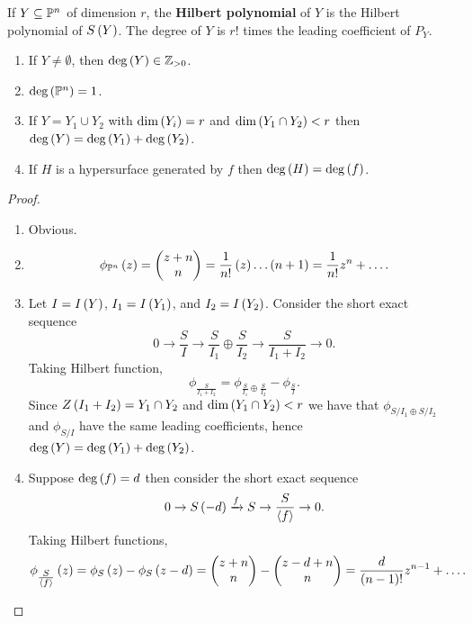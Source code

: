\pagebreak

\begin{definition}
If $ Y \subseteq \P^n $ of dimension $ r $, the \textbf{Hilbert polynomial} of $ Y $ is the Hilbert polynomial of $ S\rb{Y} $. The degree of $ Y $ is $ r! $ times the leading coefficient of $ P_Y $.
\end{definition}

\begin{theorem}
\hfill
\begin{enumerate}
\item If $ Y \ne \emptyset $, then $ \deg\rb{Y} \in \Z_{> 0} $.
\item $ \deg\rb{\P^n} = 1 $.
\item If $ Y = Y_1 \cup Y_2 $ with $ \dim\rb{Y_i} = r $ and $ \dim\rb{Y_1 \cap Y_2} < r $ then $ \deg\rb{Y} = \deg\rb{Y_1} + \deg\rb{Y_2} $.
\item If $ H $ is a hypersurface generated by $ f $ then $ \deg\rb{H} = \deg\rb{f} $.
\end{enumerate}
\end{theorem}

\begin{proof}
\hfill
\begin{enumerate}
\item Obvious.
\item
$$ \phi_{\P^n}\rb{z} = \twobyone{z + n}{n} = \dfrac{1}{n!}\rb{z} \dots \rb{n + 1} = \dfrac{1}{n!}z^n + \dots. $$
\item Let $ I = I\rb{Y} $, $ I_1 = I\rb{Y_1} $, and $ I_2 = I\rb{Y_2} $. Consider the short exact sequence
$$ 0 \to \dfrac{S}{I} \to \dfrac{S}{I_1} \oplus \dfrac{S}{I_2} \to \dfrac{S}{I_1 + I_2} \to 0. $$
Taking Hilbert function,
$$ \phi_{\tfrac{S}{I_1 + I_2}} = \phi_{\tfrac{S}{I_1} \oplus \tfrac{S}{I_2}} - \phi_{\tfrac{S}{I}}. $$
Since $ Z\rb{I_1 + I_2} = Y_1 \cap Y_2 $ and $ \dim\rb{Y_1 \cap Y_2} < r $ we have that $ \phi_{S / I_1 \oplus S / I_2} $ and $ \phi_{S / I} $ have the same leading coefficients, hence $ \deg\rb{Y} = \deg\rb{Y_1} + \deg\rb{Y_2} $.
\item Suppose $ \deg\rb{f} = d $ then consider the short exact sequence
$$ 0 \to S\rb{-d} \xrightarrow{f}{S} \to \dfrac{S}{\ab{f}} \to 0. $$
Taking Hilbert functions,
$$ \phi_{\tfrac{S}{\ab{f}}}\rb{z} = \phi_S\rb{z} - \phi_S\rb{z - d} = \twobyone{z + n}{n} - \twobyone{z - d + n}{n} = \dfrac{d}{\rb{n - 1}!}z^{n - 1} + \dots. $$
\end{enumerate}
\end{proof}

